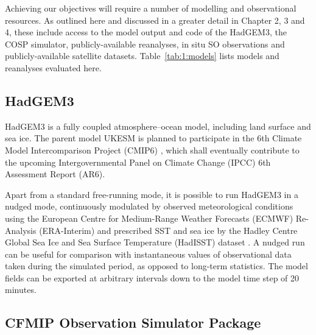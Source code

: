 Achieving our objectives will require a number of modelling and
observational resources. As outlined here and discussed in
a greater detail in Chapter 2, 3 and 4, these include access to the model output
and
code of the HadGEM3, the COSP simulator, publicly-available reanalyses,
 in situ SO observations and publicly-available
satellite datasets. Table\ \ref{tab:1:models} lists models and reanalyses
evaluated here.

\subsection{HadGEM3}

HadGEM3 is a fully coupled atmosphere--ocean model, including land surface
and sea ice. The parent model UKESM \citep{walters2017} is planned to participate
in the 6th Climate Model Intercomparison Project (CMIP6) \citep{eyring2016,meehl2014},
which shall eventually contribute to the upcoming
Intergovernmental Panel on Climate Change (IPCC) 6th
Assessment Report (AR6).

Apart from a standard free-running mode, it is possible to run HadGEM3
in a nudged mode, continuously modulated by observed meteorological
conditions using the European Centre for Medium-Range Weather Forecasts
(ECMWF) Re-Analysis (ERA-Interim) \citep{dee2011} and prescribed SST and sea ice
by the Hadley Centre Global Sea Ice and Sea Surface Temperature (HadISST) dataset \citep{rayner2003}.
A nudged run can be useful for comparison with instantaneous values of
observational data taken during the simulated period,
as opposed to long-term statistics. The model fields can be exported
at arbitrary intervals down to the model time step of 20 minutes.

\subsection{CFMIP Observation Simulator Package}

